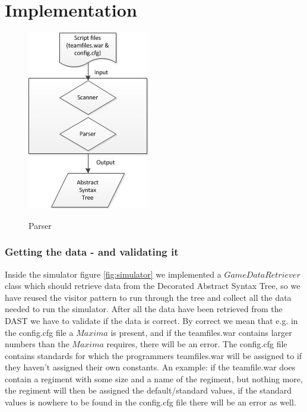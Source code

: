 \section{Implementation}

\begin{figure}[H]
\centering
\includegraphics[scale=1]{rapport/6/figures/parser}
\label{fig:parser}
\caption{Parser}
\end{figure}

\subsubsection{Getting the data - and validating it}
Inside the simulator figure \ref{fig:simulator} we implemented a $GameDataRetriever$ class which should retrieve data from the Decorated Abstract Syntax Tree, so we have reused the visitor pattern to run through the tree and collect all the data needed to run the simulator. After all the data have been retrieved from the DAST we have to validate if the data is correct. By correct we mean that e.g. in the config.cfg file a $Maxima$ is present, and if the teamfiles.war contains larger numbers than the $Maxima$ requires, there will be an error. The config.cfg file contains standards for which the programmers teamfiles.war will be assigned to if they haven't assigned their own constants. An example: if the teamfile.war does contain a regiment with some size and a name of the regiment, but nothing more, the regiment will then be assigned the default/standard values, if the standard values is nowhere to be found in the config.cfg file there will be an error as well.


